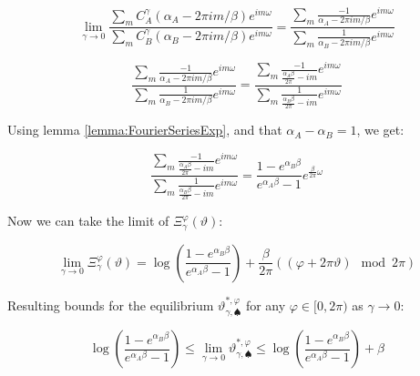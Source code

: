 \documentclass{article}
\theoremstyle{definition}
\begin{document}
\begin{equation}
    \lim_{\gamma \to 0}
    \frac{
    \sum_m C^\gamma_A(\alpha_A - 2 \pi i m/\beta) e^{i m \omega}
    }
    {
    \sum_m C^\gamma_B(\alpha_B - 2 \pi i m/\beta) e^{i m \omega}
    }=
    \frac{
    \sum_m \frac{-1}{\alpha_A - 2 \pi i m/\beta} e^{i m \omega}
    }
    {
    \sum_m \frac{1}{\alpha_B - 2 \pi i m/\beta} e^{i m \omega}
    }
\end{equation}

\begin{equation}
    \label{eq:LimitXigamma}
    \frac{
    \sum_m \frac{-1}{\alpha_A - 2 \pi i m/\beta} e^{i m \omega}
    }
    {
    \sum_m \frac{1}{\alpha_B - 2 \pi i m/\beta} e^{i m \omega}
    } = 
    \frac{
    \sum_m \frac{-1}{\frac{\alpha_A \beta}{2 \pi} - i m} e^{i m \omega}
    }
    {
    \sum_m \frac{1}{\frac{\alpha_B \beta}{2 \pi} - i m} e^{i m \omega}
    }
\end{equation}

Using lemma \ref{lemma:FourierSeriesExp}, and that $\alpha_A - \alpha_B = 1$, we get:

\begin{equation}
    \frac{
    \sum_m \frac{-1}{\frac{\alpha_A \beta}{2 \pi} - i m} e^{i m \omega}
    }
    {
    \sum_m \frac{1}{\frac{\alpha_B \beta}{2 \pi} - i m} e^{i m \omega}
    } = 
    \frac{1-e^{\alpha_B \beta}}{e^{\alpha_A \beta} - 1} e^{\frac{\beta}{2 \pi} \omega}
\end{equation}

Now we can take the limit of $\Xi^\varphi_\gamma(\vartheta)$:

\begin{equation}
    \lim_{\gamma \to 0} \Xi_\gamma^\varphi(\vartheta) =
    \log \left ( \frac{1-e^{\alpha_B \beta}}{e^{\alpha_A \beta} - 1}
    \right )
    + \frac{\beta}{2 \pi} ((\varphi + 2 \pi \vartheta) \mod 2 \pi)
\end{equation}

Resulting bounds for the equilibrium $\vartheta^{*,\varphi}_{\gamma,\spadesuit}$ for any $\varphi \in [0,2 \pi)$ as $\gamma \to 0$:

\begin{equation}
\label{eq:varthetagammaphiLimitBounds}
\boxed{
    \log \left ( 
    \frac{1-e^{\alpha_B \beta}}{e^{\alpha_A \beta} - 1}
    \right ) \le
    \lim_{\gamma \to 0}
    \vartheta^{*,\varphi}_{\gamma,\spadesuit}
    \le 
    \log \left ( 
    \frac{1-e^{\alpha_B \beta}}{e^{\alpha_A \beta} - 1}
    \right ) + \beta
    }
\end{equation}
\end{document}
